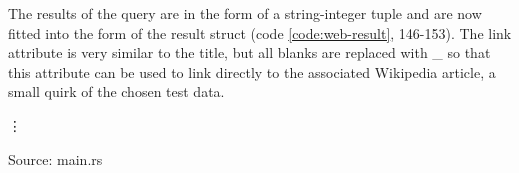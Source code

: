 The results of the query are in the form of a string-integer tuple and are now fitted into the form of the result struct (code \ref{code:web-result}, 146-153). The link attribute is very similar to the title, but all blanks are replaced with \_ so that this attribute can be used to link directly to the associated Wikipedia article, a small quirk of the chosen test data.
\begin{codeenv}
    \label{code:web-result}
    
    \vdots
    
    \centerline{Source: main.rs}
\end{codeenv}
